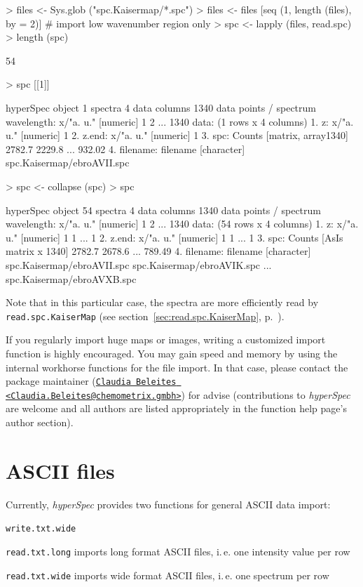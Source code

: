 \documentclass[english, a4paper, 10pt, headings=small, DIV11]{scrartcl}
\makeatletter
\renewenvironment{Schunk}{\vspace{0pt}\begin{small}}{\end{small}\vspace{0pt}}
\newcommand{\Rfunction}[2][]{\texorpdfstring{\nohyphens{#1\texttt{#2}}}{#2}}
\newcommand{\Rclass}[1]{\texorpdfstring{\nohyphens{\textit{#1}}}{#1}}
\newcommand{\phy}{\texorpdfstring{\nohyphens{\textit{hyperSpec}}}{hyperSpec}\xspace}
\newcommand{\ie}{i.\,e.\xspace}
\newcommand{\mailme}{\href{mailto:Claudia Beleites <Claudia.Beleites@chemometrix.gmbh>}{\texttt{Claudia Beleites <Claudia.Beleites@chemometrix.gmbh>}}}
\makeatother
\begin{document}
\begin{Schunk}
\begin{Sinput}
> files <- Sys.glob ("spc.Kaisermap/*.spc")
> files <- files [seq (1, length (files), by = 2)] # import low wavenumber region only
> spc <- lapply (files, read.spc)
> length (spc)
\end{Sinput}
\begin{Soutput}
[1] 54
\end{Soutput}
\begin{Sinput}
> spc [[1]]
\end{Sinput}
\begin{Soutput}
hyperSpec object
   1 spectra
   4 data columns
   1340 data points / spectrum
wavelength: x/"a. u." [numeric] 1 2 ... 1340 
data:  (1 rows x 4 columns)
   1. z: x/"a. u." [numeric] 1 
   2. z.end: x/"a. u." [numeric] 1 
   3. spc: Counts [matrix, array1340] 2782.7 2229.8 ... 932.02 
   4. filename: filename [character] spc.Kaisermap/ebroAVII.spc 
\end{Soutput}
\begin{Sinput}
> spc <- collapse (spc)
> spc
\end{Sinput}
\begin{Soutput}
hyperSpec object
   54 spectra
   4 data columns
   1340 data points / spectrum
wavelength: x/"a. u." [numeric] 1 2 ... 1340 
data:  (54 rows x 4 columns)
   1. z: x/"a. u." [numeric] 1 1 ... 1 
   2. z.end: x/"a. u." [numeric] 1 1 ... 1 
   3. spc: Counts [AsIs matrix x 1340] 2782.7 2678.6 ... 789.49 
   4. filename: filename [character] spc.Kaisermap/ebroAVII.spc spc.Kaisermap/ebroAVIK.spc ... spc.Kaisermap/ebroAVXB.spc 
\end{Soutput}
\end{Schunk}

Note that in this particular case, the spectra are more efficiently read by
\Rfunction{read.spc.KaiserMap} (see section~\ref{sec:read.spc.KaiserMap},
p.~\pageref{sec:read.spc.KaiserMap}).

If you regularly import huge maps or images, writing a customized import function is highly
encouraged. You may gain speed and memory by using the internal workhorse functions for the file
import. In that case, please contact the package maintainer (\mailme) for advise (contributions to
\phy are welcome and all authors are listed appropriately in the function help page's author
section).


\section{ASCII files}
\label{sec:ascii}
\label{sec:read.txt.long}
\label{sec:read.txt.wide}
Currently, \Rclass{hyperSpec} provides two functions for general ASCII data import:
\begin{labeling}{\Rfunction{write.txt.wide}}
\item [\Rfunction{read.txt.long}] imports long format ASCII files, \ie one intensity value per row
\item [\Rfunction{read.txt.wide}] imports wide format ASCII files, \ie one spectrum per row
\end{labeling}
\end{document}

